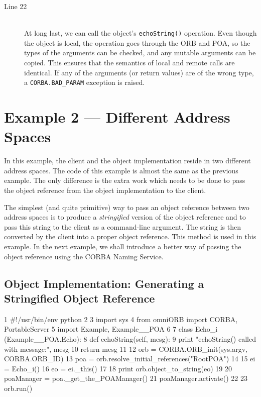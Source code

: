 \documentclass[draft,11pt,twoside,a4paper]{book}
\newcommand{\code}[1]{\texttt{#1}}
\newcommand{\op}[1]{\texttt{#1()}}
\newcommand{\term}[1]{\textit{#1}}
\begin{document}
\begin{description}

\item[Line 22]\mbox{}\\
%
At long last, we can call the object's \op{echoString} operation.
Even though the object is local, the operation goes through the ORB
and POA, so the types of the arguments can be checked, and any mutable
arguments can be copied. This ensures that the semantics of local and
remote calls are identical. If any of the arguments (or return values)
are of the wrong type, a \code{CORBA.BAD\_PARAM} exception is raised.

\end{description}


\section{Example 2 --- Different Address Spaces}

In this example, the client and the object implementation reside in
two different address spaces. The code of this example is almost the
same as the previous example. The only difference is the extra work
which needs to be done to pass the object reference from the object
implementation to the client.

The simplest (and quite primitive) way to pass an object reference
between two address spaces is to produce a \term{stringified} version
of the object reference and to pass this string to the client as a
command-line argument.  The string is then converted by the client
into a proper object reference.  This method is used in this
example. In the next example, we shall introduce a better way of
passing the object reference using the CORBA Naming Service.


\subsection{Object Implementation: Generating a Stringified Object Reference}

\lstset{stepnumber=1,gobble=4}
\begin{pylisting}
 1  #!/usr/bin/env python
 2  
 3  import sys
 4  from omniORB import CORBA, PortableServer
 5  import Example, Example__POA
 6  
 7  class Echo_i (Example__POA.Echo):
 8      def echoString(self, mesg):
 9          print "echoString() called with message:", mesg
10          return mesg
11  
12  orb = CORBA.ORB_init(sys.argv, CORBA.ORB_ID)
13  poa = orb.resolve_initial_references("RootPOA")
14  
15  ei = Echo_i()
16  eo = ei._this()
17  
18  print orb.object_to_string(eo)
19  
20  poaManager = poa._get_the_POAManager()
21  poaManager.activate()
22  
23  orb.run()
\end{pylisting}
\lstset{stepnumber=0,gobble=0}
\end{document}
